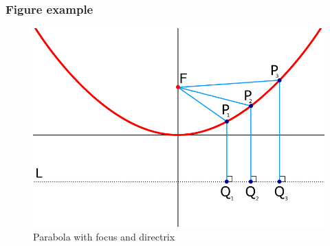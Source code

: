 \documentclass[aspectratio=169]{beamer}
\begin{document}
\begin{frame}
\frametitle{Figure example}
\begin{figure}
    \includegraphics[scale=.3]{fig/parabola.png}
    \caption{Parabola with focus and directrix}
\end{figure}
\end{frame}


\begin{frame}[plain]
\end{frame}
\end{document}
